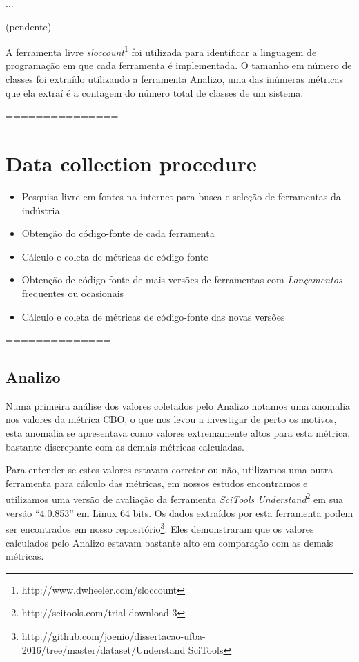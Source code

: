 {...}
\label{manutenabilidade-ferramentas}

(pendente)

A ferramenta livre {\it sloccount}\footnote{http://www.dwheeler.com/sloccount}
foi utilizada para identificar a linguagem de programação em que cada
ferramenta é implementada. O tamanho em número de classes foi extraído utilizando a ferramenta
Analizo, uma das inúmeras métricas que ela extraí é a contagem do número total
de classes de um sistema. 

===============

\section{Data collection procedure}

\begin{itemize}
  \item Pesquisa livre em fontes na internet para busca e seleção de ferramentas da indústria
  \item Obtenção do código-fonte de cada ferramenta
  \item Cálculo e coleta de métricas de código-fonte
  \item Obtenção de código-fonte de mais versões de ferramentas com {\it Lançamentos} frequentes ou ocasionais
  \item Cálculo e coleta de métricas de código-fonte das novas versões
\end{itemize}

==============

\subsection{Analizo}

Numa primeira análise dos valores coletados pelo Analizo notamos uma anomalia
nos valores da métrica CBO, o que nos levou a investigar de perto os motivos,
esta anomalia se apresentava como valores extremamente altos para esta métrica,
bastante discrepante com as demais métricas calculadas.

Para entender se estes valores estavam corretor ou não, utilizamos uma outra
ferramenta para cálculo das métricas, em nossos estudos encontramos e
utilizamos uma versão de avaliação da ferramenta {\it SciTools
Understand}\footnote{http://scitools.com/trial-download-3} em sua versão
``4.0.853'' em Linux 64 bits. Os dados extraídos por esta ferramenta podem ser
encontrados em nosso
repositório\footnote{http://github.com/joenio/dissertacao-ufba-2016/tree/master/dataset/Understand
SciTools}. Eles demonstraram que os valores calculados pelo Analizo estavam
bastante alto em comparação com as demais métricas.


